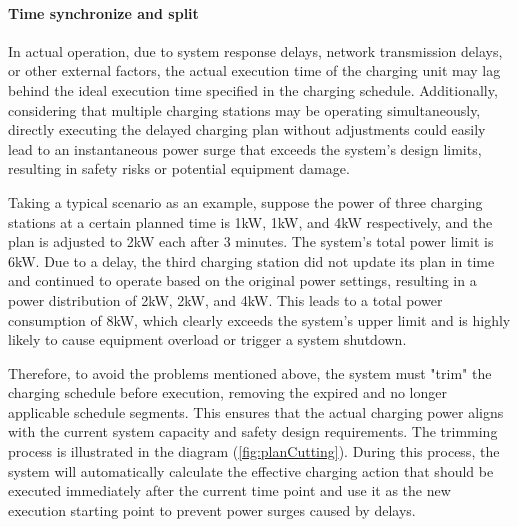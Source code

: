 \documentclass[
english,
ruledheaders=section,%
class=report,%
thesis={type=Report},%
accentcolor=9c,%
custommargins=true,%
marginpar=false,%
parskip=half-,%
fontsize=11pt,%
logofile={img/tuda_logo.pdf}, %
]{tudapub}
\begin{document}
    \paragraph{Time synchronize and split}
    \label{para:timeSynchronAndSplit}


    In actual operation, due to system response delays, network transmission delays, or other external factors, the actual execution time of the charging unit may lag behind the ideal execution time specified in the charging schedule. Additionally, considering that multiple charging stations may be operating simultaneously, directly executing the delayed charging plan without adjustments could easily lead to an instantaneous power surge that exceeds the system's design limits, resulting in safety risks or potential equipment damage.


    Taking a typical scenario as an example, suppose the power of three charging stations at a certain planned time is 1kW, 1kW, and 4kW respectively, and the plan is adjusted to 2kW each after 3 minutes. The system's total power limit is 6kW. Due to a delay, the third charging station did not update its plan in time and continued to operate based on the original power settings, resulting in a power distribution of 2kW, 2kW, and 4kW. This leads to a total power consumption of 8kW, which clearly exceeds the system's upper limit and is highly likely to cause equipment overload or trigger a system shutdown.


    Therefore, to avoid the problems mentioned above, the system must "trim" the charging schedule before execution, removing the expired and no longer applicable schedule segments. This ensures that the actual charging power aligns with the current system capacity and safety design requirements. The trimming process is illustrated in the diagram (\autoref{fig:planCutting}). During this process, the system will automatically calculate the effective charging action that should be executed immediately after the current time point and use it as the new execution starting point to prevent power surges caused by delays.
\end{document}
